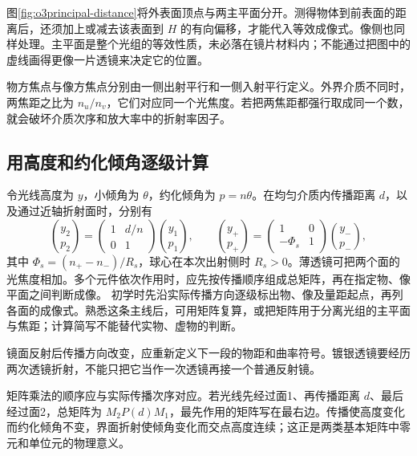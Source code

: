 图\ref{fig:o3principal-distance}将外表面顶点与两主平面分开。测得物体到前表面的距离后，还须加上或减去该表面到 $H$ 的有向偏移，才能代入等效成像式。像侧也同样处理。主平面是整个光组的等效性质，未必落在镜片材料内；不能通过把图中的虚线画得更像一片透镜来决定它的位置。

物方焦点与像方焦点分别由一侧出射平行和一侧入射平行定义。外界介质不同时，两焦距之比为 $n_u/n_v$，它们对应同一个光焦度。若把两焦距都强行取成同一个数，就会破坏介质次序和放大率中的折射率因子。

\subsection{用高度和约化倾角逐级计算}

令光线高度为 \(y\)，小倾角为 \(\theta\)，约化倾角为 \(p=n\theta\)。在均匀介质内传播距离 \(d\)，以及通过近轴折射面时，分别有
\[
 \binom{y_2}{p_2}=\begin{pmatrix}1&d/n\\0&1\end{pmatrix}\binom{y_1}{p_1},
 \qquad
 \binom{y_+}{p_+}=\begin{pmatrix}1&0\\-\Phi_s&1\end{pmatrix}\binom{y_-}{p_-},
\]
其中 \(\Phi_s=(n_+-n_-)/R_s\)，球心在本次出射侧时 \(R_s>0\)。薄透镜可把两个面的光焦度相加。多个元件依次作用时，应先按传播顺序组成总矩阵，再在指定物、像平面之间判断成像。
初学时先沿实际传播方向逐级标出物、像及量距起点，再列各面的成像式。熟悉这条主线后，可用矩阵复算，或把矩阵用于分离光组的主平面与焦距；计算简写不能替代实物、虚物的判断。

镜面反射后传播方向改变，应重新定义下一段的物距和曲率符号。镀银透镜要经历两次透镜折射，不能只把它当作一次透镜再接一个普通反射镜。

矩阵乘法的顺序应与实际传播次序对应。若光线先经过面1、再传播距离 $d$、最后经过面2，总矩阵为 $M_2P(d)M_1$，最先作用的矩阵写在最右边。传播使高度变化而约化倾角不变，界面折射使倾角变化而交点高度连续；这正是两类基本矩阵中零元和单位元的物理意义。

